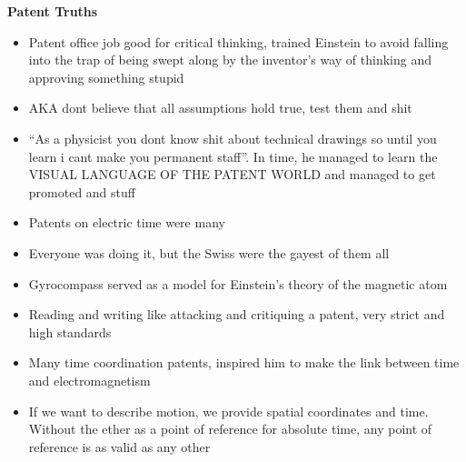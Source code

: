 \documentclass[a4paper]{article}
\begin{document}
\noindent\textbf{Patent Truths}
\begin{itemize}
	\item Patent office job good for critical thinking, trained Einstein to avoid falling into the trap of being swept along by the inventor’s way of thinking and approving something stupid
	\item AKA dont believe that all assumptions hold true, test them and shit
	\item ``As a physicist you dont know shit about technical drawings so until you learn i cant make you permanent staff''. In time, he managed to learn the VISUAL LANGUAGE OF THE PATENT WORLD and managed to get promoted and stuff
	\item Patents on electric time were many
	\item Everyone was doing it, but the Swiss were the gayest of them all
	\item Gyrocompass served as a model for Einstein’s theory of the magnetic atom
	\item Reading and writing like attacking and critiquing a patent, very strict and high standards
	\item Many time coordination patents, inspired him to make the link between time and electromagnetism
	\item If we want to describe motion, we provide spatial coordinates and time. Without the ether as a point of reference for absolute time, any point of reference is as valid as any other
\end{itemize}
\end{document}
